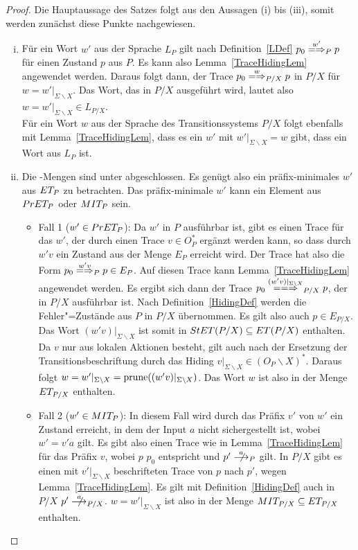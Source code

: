 \begin{proof}
  Die Hauptaussage des Satzes folgt aus den Aussagen (i) bis (iii), somit
  werden zunächst diese Punkte nachgewiesen.
  \begin{enumerate}[(i)]
    \item Für ein Wort $w'$ aus der Sprache $L_P$ gilt nach
      Definition~\ref{LDef} $p_0 \weakmay[w']_P p$ für einen Zustand $p$ aus
      $P$. Es kann also Lemma~\ref{TraceHidingLem} angewendet werden. Daraus
      folgt dann, der Trace $p_0 \weakmay[w]_{P/X} p$ in $P/X$ für
      $w=w'|_{\Sigma\backslash X}$. Das Wort, das in $P/X$ ausgeführt wird,
      lautet also $w=w'|_{\Sigma\backslash X}\in L_{P/X}$.\\
      Für ein Wort $w$ aus der Sprache des Transitionssystems $P/X$ folgt
      ebenfalls mit Lemma~\ref{TraceHidingLem}, dass es ein $w'$ mit
      $w'|_{\Sigma\backslash X} = w$ gibt, dass ein Wort aus $L_P$ ist.
    \item Die \ET{}-Mengen sind unter \cont{} abgeschlossen. Es genügt also ein
      präfix-minimales $w'$ aus $ET _{P}$ zu betrachten. Das präfix-minimale
      $w'$ kann ein Element aus $PrET _P$ oder $MIT _P$ sein.
      \begin{itemize}
        \item Fall 1 ($w'\in PrET _P$): Da $w'$ in $P$ ausführbar ist, gibt es
          einen Trace für das $w'$, der durch einen Trace $v \in O_P^*$ ergänzt
          werden kann, so dass durch $w'v$ ein Zustand aus der Menge $E_P$
          erreicht wird. Der Trace hat also die Form $p_0 \weakmay[w'v]_P p\in
          E_P$. Auf diesen Trace kann Lemma~\ref{TraceHidingLem} angewendet
          werden. Es ergibt sich dann der Trace $p_0 \lweakmay[(w'v)|_{\Sigma
          \backslash X}]_{P/X} p$, der in $P/X$ ausführbar ist. Nach
          Definition~\ref{HidingDef} werden die Fehler"=Zustände aus $P$ in
          $P/X$ übernommen. Es gilt also auch $p\in E_{P/X}$. Das Wort
          $(w'v)|_{\Sigma\backslash X}$ ist somit in $StET (P/X) \subseteq ET
          (P/X)$ enthalten. Da $v$ nur aus lokalen Aktionen besteht, gilt auch
          nach der Ersetzung der Transitionsbeschriftung durch das Hiding
          $v|_{\Sigma\backslash X}\in (O_P\backslash X)^*$. Daraus folgt $w =
          w'|_{\Sigma\backslash X} = \mathrm{prune} ((w'v)|_{\Sigma\backslash X})$. Das
          Wort $w$ ist also in der Menge $ET _{P/X}$ enthalten.
        \item Fall 2 ($w'\in MIT _P$): In diesem Fall wird durch das Präfix
          $v'$ von $w'$ ein Zustand erreicht, in dem der Input $a$ nicht
          sichergestellt ist, wobei $w'=v'a$ gilt. Es gibt also einen Trace wie
          in Lemma~\ref{TraceHidingLem} für das Präfix $v$, wobei $p$ $p_0$
          entspricht und $p'\nmust[a]_P$ gilt. In $P/X$ gibt es einen mit
          $v'|_{\Sigma\backslash X}$ beschrifteten Trace von $p$ nach $p'$,
          wegen Lemma~\ref{TraceHidingLem}. Es gilt mit
          Definition~\ref{HidingDef} auch in $P/X$ $p'\nmust[a]_{P/X}$. $w =
          w'|_{\Sigma\backslash X}$ ist also in der Menge $MIT _{P/X}
          \subseteq ET _{P/X}$ enthalten.
      \end{itemize}


\end{enumerate}
\end{proof}
